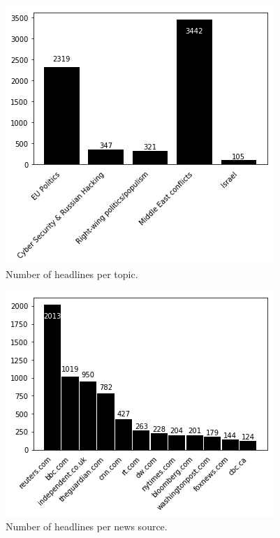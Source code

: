 \documentclass[final]{ieee}
\begin{document}
\begin{figure}[!hbt]
  
  \centering
    \includegraphics[width=\columnwidth]{topic_dist_bars.png}
    \caption{Number of headlines per topic.}
  \label{fig:topic_dist}
\end{figure}

\begin{figure}[!hbt]
  
  \centering
    \includegraphics[width=\columnwidth]{domain_dist.png}
    \caption{Number of headlines per news source.}
  \label{fig:domain_dist}
\end{figure}
\end{document}
